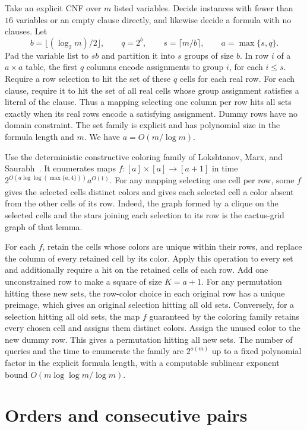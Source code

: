 \documentclass[11pt]{article}
\begin{document}
Take an explicit CNF over \(m\) listed variables. Decide instances with fewer
than \(16\) variables or an empty clause directly, and likewise decide a
formula with no clauses. Let
\[
 b=\lfloor (\log_2 m)/2\rfloor,\qquad
 q=2^b,\qquad s=\lceil m/b\rceil,\qquad a=\max\{s,q\}.
\]
Pad the variable list to \(sb\) and partition it into \(s\) groups of size
\(b\). In row \(i\) of a \(a\times a\) table, the first \(q\) columns encode
assignments to group \(i\), for each \(i\le s\). Require a row selection to
hit the set of these \(q\) cells for each real row. For each clause, require
it to hit the set of all real cells whose group assignment satisfies a
literal of the clause. Thus a mapping selecting one column per row hits all
sets exactly when its real rows encode a satisfying assignment. Dummy
rows have no domain constraint. The set family is explicit and has polynomial
size in the formula length and \(m\). We have \(a=O(m/\log m)\).

Use the deterministic constructive coloring family of Lokshtanov, Marx, and
Saurabh~\cite[Lemma 2.8 and its proof]{lms}. It enumerates maps
\(f\colon[a]\times[a]\to[a+1]\) in time
\(2^{O(a\log\log(\max\{a,4\}))}a^{O(1)}\). For any mapping selecting one cell
per row, some \(f\) gives the selected cells distinct colors and gives each
selected cell a color absent from the other cells of its row. Indeed, the
graph formed by a clique on the selected cells and the stars joining each
selection to its row is the cactus-grid graph of that lemma.

For each \(f\), retain the cells whose colors are unique within their rows, and
replace the column of every retained cell by its color. Apply this operation to
every set and additionally require a hit on the retained cells of each row.
Add one unconstrained row to make a square of size \(K=a+1\).
For any permutation hitting these new sets, the row-color choice in each
original row has a unique preimage, which gives an original selection hitting
all old sets. Conversely, for a selection hitting all old sets, the map
\(f\) guaranteed by the coloring family retains every chosen cell and assigns
them distinct colors. Assign the unused color to the new dummy row. This
gives a permutation hitting all new sets. The number of queries and the time
to enumerate the family are \(2^{o(m)}\) up to a fixed polynomial factor in
the explicit formula length, with a computable sublinear exponent bound
\(O(m\log\log m/\log m)\).


\section{Orders and consecutive pairs}
\end{document}
